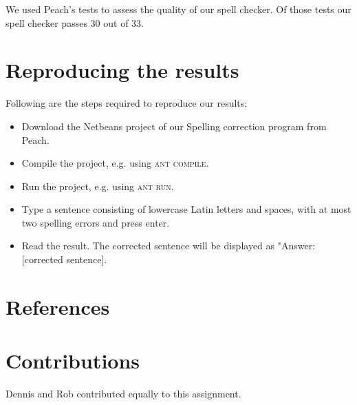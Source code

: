 \documentclass[11pt,a4paper]{article}
\begin{document}
We used Peach's tests to assess the quality of our spell checker. Of those tests our spell checker passes 30 out of 33.

\section{Reproducing the results}
Following are the steps required to reproduce our results:
\begin{itemize}
\item Download the Netbeans project of our Spelling correction program from Peach.
\item Compile the project, e.g. using \textsc{ant compile}.
\item Run the project, e.g. using \textsc{ant run}.
\item Type a sentence consisting of lowercase Latin letters and spaces, with at most two spelling errors and press enter.
\item Read the result. The corrected sentence will be displayed as "Answer: [corrected sentence].
\end{itemize}

\section{References}


\section{Contributions}
Dennis and Rob contributed equally to this assignment.
\end{document}
